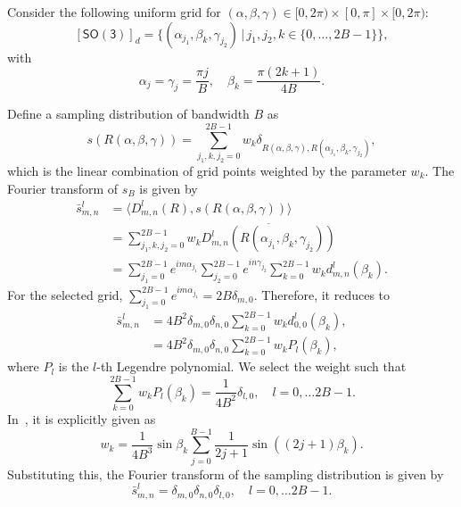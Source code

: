 \documentclass[onecolumn,11pt]{IEEEtran}
\newcommand{\pair}[1]{\ensuremath{\langle #1 \rangle}}
\newcommand{\SO}{\ensuremath{\mathsf{SO(3)}}}
\begin{document}
Consider the following uniform grid for $(\alpha,\beta,\gamma)\in[0,2\pi)\times[0,\pi]\times[0,2\pi)$:
\[
[\SO]_d=\{(\alpha_{j_1},\beta_k,\gamma_{j_2})\,|\, j_1,j_2,k\in\{0,\ldots, 2B-1\}\},
\]
with
\begin{equation}\label{eqn:grid}
\alpha_j=\gamma_j= \frac{\pi j}{B},\quad \beta_k = \frac{\pi (2k+1)}{4B}.
\end{equation}

Define a sampling distribution of bandwidth $B$ as
\begin{equation}
s(R(\alpha,\beta,\gamma))=\sum_{j_1,k,j_2=0}^{2B-1} w_k \delta_{R(\alpha,\beta,\gamma),R(\alpha_{j_1},\beta_k,\gamma_{j_2})},
\end{equation}
which is the linear combination of grid points weighted by the parameter $w_k$. 
The Fourier transform of $s_B$ is given by
\begin{align*}
\bar s^l_{m,n} & = \pair{ D^l_{m,n}(R), s(R(\alpha,\beta,\gamma))}\\
&=\sum_{j_1,k,j_2=0}^{2B-1} w_k \overline{D^l_{m,n}(R(\alpha_{j_1},\beta_k,\gamma_{j_2}))}\\
& = \sum_{j_1=0}^{2B-1} e^{im\alpha_{j_1}}
\sum_{j_2=0}^{2B-1} e^{in\gamma_{j_2}}
\sum_{k=0}^{2B-1} w_k d^l_{m,n}(\beta_k).
\end{align*}
For the selected grid, $\sum_{j_1=0}^{2B-1} e^{im\alpha_{j_1}}=2B \delta_{m,0}$. 
Therefore, it reduces to
\begin{align*}
\bar s^l_{m,n}  
& = 4B^2 \delta_{m,0}\delta_{n,0}\sum_{k=0}^{2B-1} w_k d^l_{0,0}(\beta_k),\\
& = 4B^2 \delta_{m,0}\delta_{n,0}\sum_{k=0}^{2B-1} w_k P_l(\beta_k),
\end{align*}
where $P_l$ is the $l$-th Legendre polynomial. 
We select the weight such that
\begin{equation}
\sum_{k=0}^{2B-1} w_k P_l(\beta_k) = \frac{1}{4B^2} \delta_{l,0},\quad l=0,\ldots 2B-1.
\end{equation}
In~\cite{DriHeaAAM94}, it is explicitly given as
\begin{equation}
w_k = \frac{1}{4B^3}\sin\beta_k \sum_{j=0}^{B-1} \frac{1}{2j+1}\sin((2j+1)\beta_k).
\end{equation}
Substituting this, the Fourier transform of the sampling distribution is given by
\begin{equation}
\bar s ^l_{m,n}=\delta_{m,0}\delta_{n,0}\delta_{l,0},\quad l=0,\ldots 2B-1.
\label{eqn:bar_s}
\end{equation}
\end{document}
